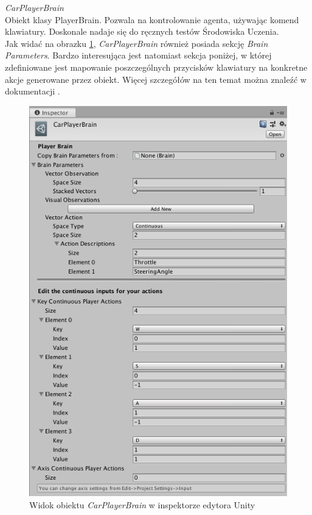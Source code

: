 \begin{enumerate*}
\item \textit{CarPlayerBrain} \\
Obiekt klasy PlayerBrain. Pozwala na kontrolowanie agenta, używając komend klawiatury. Doskonale nadaje się do ręcznych testów Środowiska Uczenia. \\
Jak widać na obrazku \ref{CarPlayerBrainView}, \textit{CarPlayerBrain} również posiada sekcję \textit{Brain Parameters}. Bardzo interesująca jest natomiast sekcja poniżej, w której zdefiniowane jest mapowanie poszczególnych przycisków klawiatury na konkretne akcje generowane przez obiekt. Więcej szczegółów na ten temat można znaleźć w dokumentacji \cite{unity:playerBrainDescription}.

\vspace{0.5cm}
\begin{figure}[H]
\centering
\includegraphics[width=13cm]{resources/figures/carPlayerBrain.png}
\caption{Widok obiektu \textit{CarPlayerBrain} w inspektorze edytora Unity}
\label{CarPlayerBrainView}
\end{figure}
\end{enumerate*}

